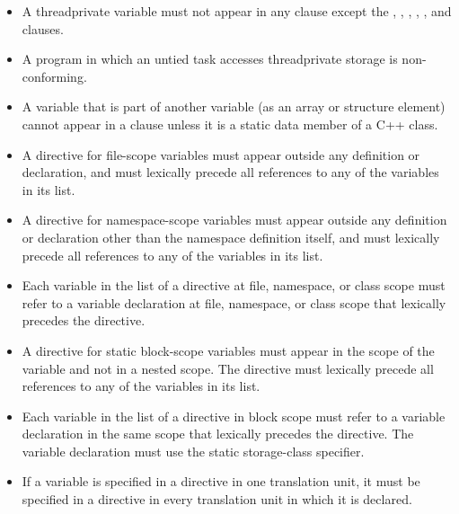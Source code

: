\begin{itemize} %
\item A threadprivate variable must not appear in any clause except the , 
, , , , and  clauses.

\item A program in which an untied task accesses threadprivate storage is non-conforming.

\ccppspecificstart
\item A variable that is part of another variable (as an array or structure element) cannot 
appear in a  clause unless it is a static data member of a C++ 
class.

\item A  directive for file-scope variables must appear outside any 
definition or declaration, and must lexically precede all references to any of the 
variables in its list.

\item A  directive for namespace-scope variables must appear outside 
any definition or declaration other than the namespace definition itself, and must 
lexically precede all references to any of the variables in its list.

\item Each variable in the list of a  directive at file, namespace, or class 
scope must refer to a variable declaration at file, namespace, or class scope that 
lexically precedes the directive.

\item A  directive for static block-scope variables must appear in the 
scope of the variable and not in a nested scope. The directive must lexically precede 
all references to any of the variables in its list.

\item Each variable in the list of a  directive in block scope must refer to 
a variable declaration in the same scope that lexically precedes the directive. The 
variable declaration must use the static storage-class specifier.

\item If a variable is specified in a  directive in one translation unit, it 
must be specified in a  directive in every translation unit in which 
it is declared.


\end{itemize}
